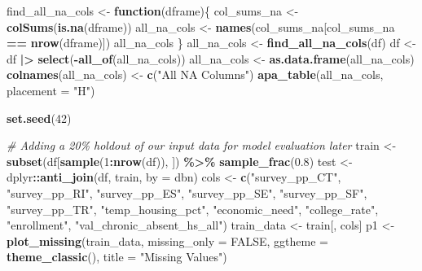 \documentclass[
  man,floatsintext]{apa6}
\newenvironment{Shaded}{\begin{snugshade}}{\end{snugshade}}
\newcommand{\AttributeTok}[1]{\textcolor[rgb]{0.13,0.29,0.53}{#1}}
\newcommand{\CommentTok}[1]{\textcolor[rgb]{0.56,0.35,0.01}{\textit{#1}}}
\newcommand{\ConstantTok}[1]{\textcolor[rgb]{0.56,0.35,0.01}{#1}}
\newcommand{\ControlFlowTok}[1]{\textcolor[rgb]{0.13,0.29,0.53}{\textbf{#1}}}
\newcommand{\DecValTok}[1]{\textcolor[rgb]{0.00,0.00,0.81}{#1}}
\newcommand{\FloatTok}[1]{\textcolor[rgb]{0.00,0.00,0.81}{#1}}
\newcommand{\FunctionTok}[1]{\textcolor[rgb]{0.13,0.29,0.53}{\textbf{#1}}}
\newcommand{\NormalTok}[1]{#1}
\newcommand{\OtherTok}[1]{\textcolor[rgb]{0.56,0.35,0.01}{#1}}
\newcommand{\SpecialCharTok}[1]{\textcolor[rgb]{0.81,0.36,0.00}{\textbf{#1}}}
\newcommand{\StringTok}[1]{\textcolor[rgb]{0.31,0.60,0.02}{#1}}
\begin{document}
\begin{Shaded}
\begin{Highlighting}[]
\NormalTok{find\_all\_na\_cols }\OtherTok{\textless{}{-}} \ControlFlowTok{function}\NormalTok{(dframe)\{}
\NormalTok{    col\_sums\_na }\OtherTok{\textless{}{-}} \FunctionTok{colSums}\NormalTok{(}\FunctionTok{is.na}\NormalTok{(dframe))}
\NormalTok{    all\_na\_cols }\OtherTok{\textless{}{-}} \FunctionTok{names}\NormalTok{(col\_sums\_na[col\_sums\_na }\SpecialCharTok{==} \FunctionTok{nrow}\NormalTok{(dframe)])}
\NormalTok{    all\_na\_cols}
\NormalTok{\}}
\NormalTok{all\_na\_cols }\OtherTok{\textless{}{-}} \FunctionTok{find\_all\_na\_cols}\NormalTok{(df)}
\NormalTok{df }\OtherTok{\textless{}{-}}\NormalTok{ df }\SpecialCharTok{|\textgreater{}}
    \FunctionTok{select}\NormalTok{(}\SpecialCharTok{{-}}\FunctionTok{all\_of}\NormalTok{(all\_na\_cols))}
\NormalTok{all\_na\_cols }\OtherTok{\textless{}{-}} \FunctionTok{as.data.frame}\NormalTok{(all\_na\_cols)}
\FunctionTok{colnames}\NormalTok{(all\_na\_cols) }\OtherTok{\textless{}{-}} \FunctionTok{c}\NormalTok{(}\StringTok{"All NA Columns"}\NormalTok{)}
\FunctionTok{apa\_table}\NormalTok{(all\_na\_cols, }\AttributeTok{placement =} \StringTok{"H"}\NormalTok{)}

\FunctionTok{set.seed}\NormalTok{(}\DecValTok{42}\NormalTok{)}

\CommentTok{\# Adding a 20\% holdout of our input data for model evaluation later}
\NormalTok{train }\OtherTok{\textless{}{-}} \FunctionTok{subset}\NormalTok{(df[}\FunctionTok{sample}\NormalTok{(}\DecValTok{1}\SpecialCharTok{:}\FunctionTok{nrow}\NormalTok{(df)), ]) }\SpecialCharTok{\%\textgreater{}\%} \FunctionTok{sample\_frac}\NormalTok{(}\FloatTok{0.8}\NormalTok{)}
\NormalTok{test  }\OtherTok{\textless{}{-}}\NormalTok{ dplyr}\SpecialCharTok{::}\FunctionTok{anti\_join}\NormalTok{(df, train, }\AttributeTok{by =} \StringTok{\textquotesingle{}dbn\textquotesingle{}}\NormalTok{)}
\NormalTok{cols }\OtherTok{\textless{}{-}} \FunctionTok{c}\NormalTok{(}\StringTok{"survey\_pp\_CT"}\NormalTok{, }\StringTok{"survey\_pp\_RI"}\NormalTok{,}
          \StringTok{"survey\_pp\_ES"}\NormalTok{, }\StringTok{"survey\_pp\_SE"}\NormalTok{,}
          \StringTok{"survey\_pp\_SF"}\NormalTok{, }\StringTok{"survey\_pp\_TR"}\NormalTok{,}
          \StringTok{"temp\_housing\_pct"}\NormalTok{, }\StringTok{"economic\_need"}\NormalTok{,}
          \StringTok{"college\_rate"}\NormalTok{, }\StringTok{"enrollment"}\NormalTok{,}
          \StringTok{"val\_chronic\_absent\_hs\_all"}\NormalTok{)}
\NormalTok{train\_data }\OtherTok{\textless{}{-}}\NormalTok{ train[, cols]}
\NormalTok{p1 }\OtherTok{\textless{}{-}} \FunctionTok{plot\_missing}\NormalTok{(train\_data, }\AttributeTok{missing\_only =} \ConstantTok{FALSE}\NormalTok{,}
                   \AttributeTok{ggtheme =} \FunctionTok{theme\_classic}\NormalTok{(), }\AttributeTok{title =} \StringTok{"Missing Values"}\NormalTok{)}


\end{Highlighting}
\end{Shaded}
\end{document}
